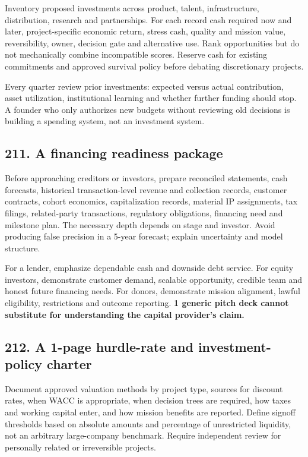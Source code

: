 Inventory proposed investments across product, talent, infrastructure, distribution, research and partnerships. For each record cash required now and later, project-specific economic return, stress cash, quality and mission value, reversibility, owner, decision gate and alternative use. Rank opportunities but do not mechanically combine incompatible scores. Reserve cash for existing commitments and approved survival policy before debating discretionary projects.

Every quarter review prior investments: expected versus actual contribution, asset utilization, institutional learning and whether further funding should stop. A founder who only authorizes new budgets without reviewing old decisions is building a spending system, not an investment system.

\subsection{211. A financing readiness package}


Before approaching creditors or investors, prepare reconciled statements, cash forecasts, historical transaction-level revenue and collection records, customer contracts, cohort economics, capitalization records, material IP assignments, tax filings, related-party transactions, regulatory obligations, financing need and milestone plan. The necessary depth depends on stage and investor. Avoid producing false precision in a 5-year forecast; explain uncertainty and model structure.

For a lender, emphasize dependable cash and downside debt service. For equity investors, demonstrate customer demand, scalable opportunity, credible team and honest future financing needs. For donors, demonstrate mission alignment, lawful eligibility, restrictions and outcome reporting. \textbf{1 generic pitch deck cannot substitute for understanding the capital provider's claim.}

\subsection{212. A 1-page hurdle-rate and investment-policy charter}


Document approved valuation methods by project type, sources for discount rates, when WACC is appropriate, when decision trees are required, how taxes and working capital enter, and how mission benefits are reported. Define signoff thresholds based on absolute amounts and percentage of unrestricted liquidity, not an arbitrary large-company benchmark. Require independent review for personally related or irreversible projects.

